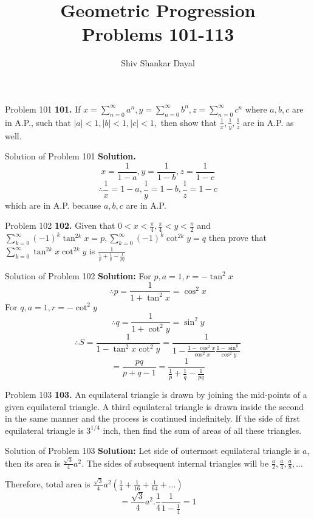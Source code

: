 \documentclass[aspectratio=1610,8pt]{beamer}
\title{Geometric Progression\\Problems 101-113}
\author[Shiv Shankar Dayal]{Shiv Shankar Dayal}
\begin{document}
\begin{frame}
  \titlepage
\end{frame}
\begin{frame}{Problem 101}
  \textbf{101.} If $x = \sum_{n=0}^\infty a^n, y = \sum_{n=0}^\infty b^n, z = \sum_{n=0}^\infty c^n$ where $a, b, c$ are in A.P.,
  such that $|a| < 1, |b|< 1, |c| < 1,$ then show that $\frac{1}{x}, \frac{1}{y}, \frac{1}{z}$ are in A.P. as well.
\end{frame}
\begin{frame}{Solution of Problem 101}
  \textbf{Solution.} $$x = \frac{1}{1 - a}, y = \frac{1}{1 - b}, z = \frac{1}{1 - c}$$
  $$\therefore \frac{1}{x} = 1 -a, \frac{1}{y} = 1 - b, \frac{1}{z} = 1 - c$$ which are in A.P. because $a, b, c$ are in A.P.
\end{frame}
\begin{frame}{Problem 102}
  \textbf{102.} Given that $0 < x< \frac{\pi}{4}, \frac{\pi}{4} < y <\frac{\pi}{2}$ and $\sum_{k=0}^\infty(-1)^k\tan^{2k}x = p,
  \sum_{k=0}^\infty(-1)^k\cot^{2k}y = q$ then prove that $\sum_{k = 0}^\infty \tan^{2k}x\cot^{2k}y$ is $\frac{1}{\frac{1}{p} +
    \frac{1}{q} - \frac{1}{pq}}$
\end{frame}
\begin{frame}{Solution of Problem 102}
  \textbf{Solution:} For $p, a= 1, r= -\tan^2x$
  $$\therefore p = \frac{1}{1 +\tan^2x} = \cos^2x$$
  For $q, a = 1, r = -\cot^2y$
  $$\therefore q = \frac{1}{1 + \cot^2y} = \sin^2y$$
  $$\therefore S = \frac{1}{1 -\tan^2x\cot^2y} = \frac{1}{1 - \frac{1 - \cos^2x}{\cos^2x}\frac{1 - \sin^y}{\cos^2y}}$$
  $$= \frac{pq}{p + q - 1} = \frac{1}{\frac{1}{p} + \frac{1}{q} - \frac{1}{pq}}$$
\end{frame}
\begin{frame}{Problem 103}
  \textbf{103.} An equilateral triangle is drawn by joining the mid-points of a given equilateral triangle. A third equilateral
  triangle is drawn inside the second in the same manner and the process is continued indefinitely. If the side of first
  equilateral triangle is $3^{1/4}$ inch, then find the sum of areas of all these triangles.
\end{frame}
\begin{frame}{Solution of Problem 103}
  \textbf{Solution:} Let side of outermost equilateral triangle is $a$, then its area is $\frac{\sqrt{3}}{4}a^2$. The sides of
  subsequent internal triangles will be $\frac{a}{2}, \frac{a}{4}, \frac{a}{8}, ...$

  Therefore, total area is $\frac{\sqrt{3}}{4}a^2\left(\frac{1}{4} + \frac{1}{16} + \frac{1}{64} + ... \right)$
  $$=\frac{\sqrt{3}}{4}a^2.\frac{1}{4}\frac{1}{1 - \frac{1}{4}} = 1$$
\end{frame}
\end{document}
